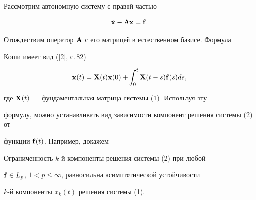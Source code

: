  


Рассмотрим автономную систему с правой частью 


\begin{equation} 


\Dot{\bold x}-\bold A\bold x=\bold f. 


\end{equation} 


 


Отождествим оператор $\bold A$ с его матрицей в естественном базисе. Формула 


Коши имеет вид ([2], с.\,82) 


\begin{equation} 


\bold x(t)=\bold X(t)\bold x(0)+\int^t_0 


\bold X(t-s)\bold f(s)ds, 


\end{equation} 


где $\bold X(t)$ --- фундаментальная матрица системы (1). Используя эту 


формулу, можно устанавливать вид зависимости компонент решения системы (2) от 


функции $\bold f(t)$. Например, докажем 


 


\begin{cor} 


Ограниченность $k$-й компоненты решения системы (2) при любой 


$\bold f\in L_p$, $1<p\le\infty$, равносильна асимптотической устойчивости 


$k$-й компоненты $x_k(t)$ решения системы (1). 


\end{cor} 


 


